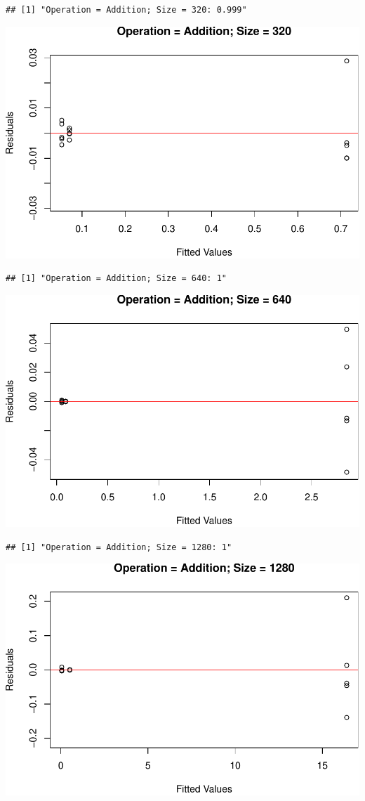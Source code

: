 \documentclass[
]{article}
\begin{document}
\begin{verbatim}
## [1] "Operation = Addition; Size = 320: 0.999"
\end{verbatim}

\includegraphics{main_files/figure-latex/unnamed-chunk-20-6.pdf}

\begin{verbatim}
## [1] "Operation = Addition; Size = 640: 1"
\end{verbatim}

\includegraphics{main_files/figure-latex/unnamed-chunk-20-7.pdf}

\begin{verbatim}
## [1] "Operation = Addition; Size = 1280: 1"
\end{verbatim}

\includegraphics{main_files/figure-latex/unnamed-chunk-20-8.pdf}
\end{document}
